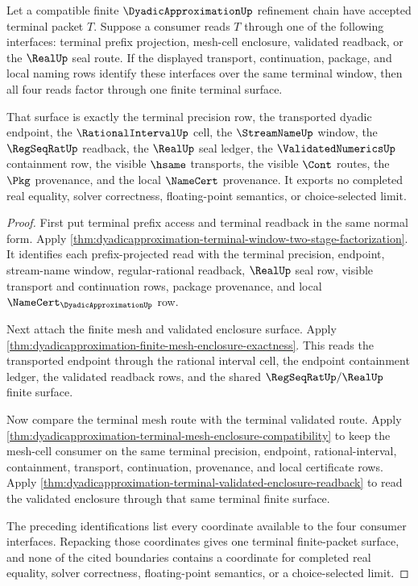 \begin{theorem}
\label{thm:dyadicapproximation-terminal-finite-packet-real-readback}
Let a compatible finite $\DyadicApproximationUp$ refinement chain have accepted
terminal packet $T$. Suppose a consumer reads $T$ through one of the following
interfaces: terminal prefix projection, mesh-cell enclosure, validated
readback, or the $\RealUp$ seal route. If the displayed transport,
continuation, package, and local naming rows identify these interfaces over the
same terminal window, then all four reads factor through one finite terminal
surface.

That surface is exactly the terminal precision row, the transported dyadic
endpoint, the $\RationalIntervalUp$ cell, the $\StreamNameUp$ window, the
$\RegSeqRatUp$ readback, the $\RealUp$ seal ledger, the
$\ValidatedNumericsUp$ containment row, the visible $\hsame$ transports, the
visible $\Cont$ routes, the $\Pkg$ provenance, and the local $\NameCert$
provenance. It exports no completed real equality, solver correctness,
floating-point semantics, or choice-selected limit.
\end{theorem}
\begin{proof}
First put terminal prefix access and terminal readback in the same normal form.
Apply \autoref{thm:dyadicapproximation-terminal-window-two-stage-factorization}.
It identifies each prefix-projected read with the terminal precision, endpoint,
stream-name window, regular-rational readback, $\RealUp$ seal row, visible
transport and continuation rows, package provenance, and local
$\NameCert_{\DyadicApproximationUp}$ row.

Next attach the finite mesh and validated enclosure surface. Apply
\autoref{thm:dyadicapproximation-finite-mesh-enclosure-exactness}. This reads
the transported endpoint through the rational interval cell, the endpoint
containment ledger, the validated readback rows, and the shared
$\RegSeqRatUp/\RealUp$ finite surface.

Now compare the terminal mesh route with the terminal validated route. Apply
\autoref{thm:dyadicapproximation-terminal-mesh-enclosure-compatibility} to keep
the mesh-cell consumer on the same terminal precision, endpoint,
rational-interval, containment, transport, continuation, provenance, and local
certificate rows. Apply
\autoref{thm:dyadicapproximation-terminal-validated-enclosure-readback} to read
the validated enclosure through that same terminal finite surface.

The preceding identifications list every coordinate available to the four
consumer interfaces. Repacking those coordinates gives one terminal
finite-packet surface, and none of the cited boundaries contains a coordinate
for completed real equality, solver correctness, floating-point semantics, or
a choice-selected limit.
\end{proof}
